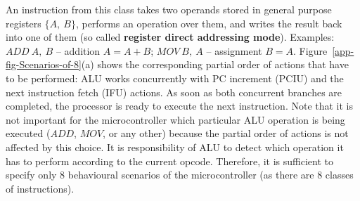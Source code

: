 An instruction from this class takes two operands stored in general
purpose registers $\{A,\ B\}$, performs an operation over them, and
writes the result back into one of them (so called \textbf{register
direct addressing mode}). Examples: $\mathit{ADD\ A,\ B}$ -- addition
$A=A+B$; $\mathit{MOV\ B,\ A}$ -- assignment $B=A$. Figure~\ref{app-fig-Scenarios-of-8}(a)
shows the corresponding partial order of actions that have to be performed:
ALU works concurrently with PC increment (PCIU) and the next instruction
fetch (IFU) actions. As soon as both concurrent branches are completed,
the processor is ready to execute the next instruction. Note that
it is not important for the microcontroller which particular ALU operation
is being executed ($\mathit{ADD}$, $\mathit{MOV}$, or any other)
because the partial order of actions is not affected by this choice.
It is responsibility of ALU to detect which operation it has to perform
according to the current opcode. Therefore, it is sufficient to specify
only 8 behavioural scenarios of the microcontroller (as there are
8 classes of instructions).

